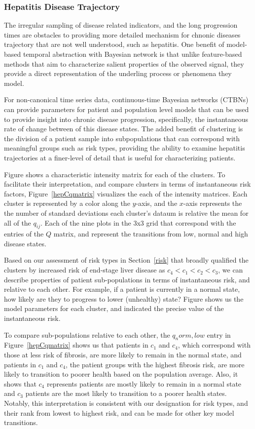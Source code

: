 \subsubsection{Hepatitis Disease Trajectory}
  The irregular sampling of disease related indicators, and the long progression times are obstacles to providing more detailed mechanism for chnonic diseases trajectory that are not well understood, such as hepatitis.  One benefit of model-based temporal abstraction with Bayesian network is that unlike feature-based methods that aim to characterize salient properties of the observed signal, they provide a direct representation of the underling process or phenomena they model.

  For non-canonical time series data, continuous-time Bayesian networks (CTBNs) can provide parameters for patient and population level models that can be used to provide insight into chronic disease progression, specifically, the instantaneous rate of change between of this disease states.  The added benefit of clustering is the division of a patient sample into subpopulations that can correspond with meaningful groups such as risk types, providing the ability to examine hepatitis trajectories at a finer-level of detail that is useful for characterizing patients.

  Figure\cite{fig:hepq} shows a characteristic intensity matrix for each of the clusters. To facilitate their interpretation, and compare clusters in terms of instantaneous risk factors, Figure~\ref{hepCqmatrix} visualizes the each of the intensity matrices.  Each cluster is represented by a color along the $y$-axis, and the $x$-axis represents the the number of standard deviations each cluster's dataum is relative the mean for all of the $q_{ij}$.  Each of the nine plots in the 3x3 grid that correspond with the entries of the $Q$ matrix, and represent the transitions from low, normal and high disease states.

Based on our assessment of risk types in Section~\ref{risk} that broadly qualified the clusters by increased risk of end-stage liver disease as $c_4 < c_1 < c_2 < c_3$, we can describe properties of patient sub-populations in terms of instantaneous risk, and relative to each other.  For example, if a patient is currently in a normal state, how likely are they to progress to lower (unhealthy) state?  Figure\cite{fig:hepq} shows us the model parameters for each cluster, and indicated the precise value of the instantaneous risk.

To compare sub-populations relative to each other, the $q_norm,low$ entry in Figure~\ref{hepCqmatrix} shows us that patients in $c_1$ and $c_4$, which correspond with those at less risk of fibrosis, are more likely to remain in the normal state, and patients in  $c_1$ and $c_4$, the patient groups with the highest fibrosis risk, are more likely to transition to poorer health based on the population average. Also, it shows that $c_4$ represents patients are mostly likely to remain in a normal state and $c_3$ patients are the most likely to transition to a poorer health states.  Notably, this interpretation is consistent with our designation for risk types, and their rank from lowest to highest risk, and can be made for other key model transitions.

